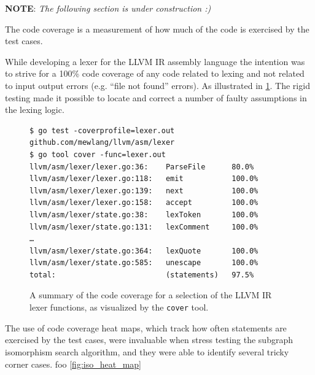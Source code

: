 \textbf{NOTE}: \textit{The following section is under construction :)}


The code coverage is a measurement of how much of the code is exercised by the test cases.


While developing a lexer for the LLVM IR assembly language the intention was to strive for a 100\% code coverage of any code related to lexing and not related to input output errors (e.g. ``file not found'' errors). As illustrated in \cref{fig:lexer_code_coverage}. The rigid testing made it possible to locate and correct a number of faulty assumptions in the lexing logic.

\begin{figure}[htbp]
	\begin{center}
		\begin{verbatim}
$ go test -coverprofile=lexer.out github.com/mewlang/llvm/asm/lexer
$ go tool cover -func=lexer.out
llvm/asm/lexer/lexer.go:36:    ParseFile      80.0%
llvm/asm/lexer/lexer.go:118:   emit           100.0%
llvm/asm/lexer/lexer.go:139:   next           100.0%
llvm/asm/lexer/lexer.go:158:   accept         100.0%
llvm/asm/lexer/state.go:38:    lexToken       100.0%
llvm/asm/lexer/state.go:131:   lexComment     100.0%
…
llvm/asm/lexer/state.go:364:   lexQuote       100.0%
llvm/asm/lexer/state.go:585:   unescape       100.0%
total:                         (statements)   97.5%
		\end{verbatim}
		\caption{A summary of the code coverage for a selection of the LLVM IR lexer functions, as visualized by the \texttt{cover} tool.}
		\label{fig:lexer_code_coverage}
	\end{center}
\end{figure}

The use of code coverage heat maps, which track how often statements are exercised by the test cases, were invaluable when stress testing the subgraph isomorphism search algorithm, and they were able to identify several tricky corner cases. foo \cref{fig:iso_heat_map}

